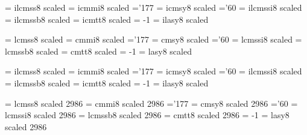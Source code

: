 \font\iseventeenrm   = ilcmss8  scaled  %
\font\iseventeeni    = icmmi8   scaled  %
    \skewchar\iseventeeni ='177                  %
\font\iseventeensy   = icmsy8   scaled  %
    \skewchar\iseventeensy ='60           %
\font\iseventeenit   = ilcmssi8 scaled  %
\font\iseventeenbf   = ilcmssb8 scaled  %
\font\iseventeentt   = icmtt8   scaled  %
    \hyphenchar\iseventeentt = -1         %
\font\iseventeenlasy = ilasy8  scaled  %

\font\twentyrm   = lcmss8  scaled  %
\font\twentyi    = cmmi8   scaled  %
    \skewchar\twentyi ='177                  %
\font\twentysy   = cmsy8   scaled  %
    \skewchar\twentysy ='60           %
\font\twentyit   = lcmssi8 scaled  %
\font\twentybf   = lcmssb8 scaled  %
\font\twentytt   = cmtt8   scaled  %
    \hyphenchar\twentytt = -1         %
\font\twentylasy = lasy8  scaled  %

\font\itwentyrm   = ilcmss8  scaled  %
\font\itwentyi    = icmmi8   scaled  %
    \skewchar\itwentyi ='177                  %
\font\itwentysy   = icmsy8   scaled  %
    \skewchar\itwentysy ='60           %
\font\itwentyit   = ilcmssi8 scaled  %
\font\itwentybf   = ilcmssb8 scaled  %
\font\itwentytt   = icmtt8   scaled  %
    \hyphenchar\itwentytt = -1         %
\font\itwentylasy = ilasy8  scaled  %

\font\twentyfourrm   = lcmss8  scaled 2986 %
\font\twentyfouri    = cmmi8   scaled 2986 %
    \skewchar\twentyfouri ='177                  %
\font\twentyfoursy   = cmsy8   scaled 2986 %
    \skewchar\twentyfoursy ='60           %
\font\twentyfourit   = lcmssi8 scaled 2986 %
\font\twentyfourbf   = lcmssb8 scaled 2986 %
\font\twentyfourtt   = cmtt8   scaled 2986 %
    \hyphenchar\twentyfourtt = -1         %
\font\twentyfourlasy = lasy8  scaled 2986 %

